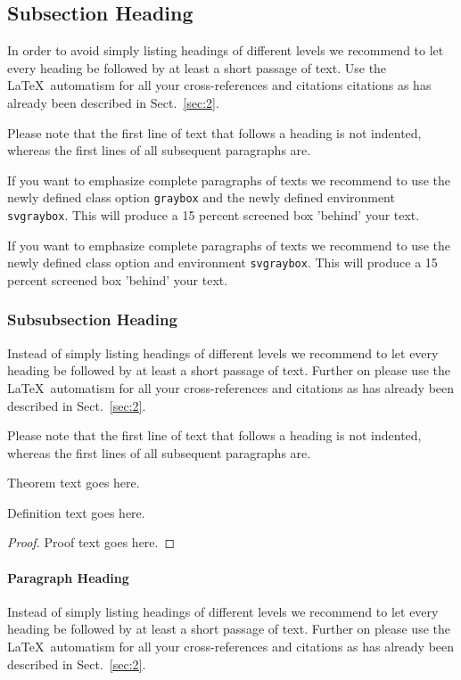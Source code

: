 \documentclass[graybox]{svmult}
\begin{document}
\subsection{Subsection Heading} %
In order to avoid simply listing headings of different levels we recommend to let every heading be followed by at least a short passage of text. Use the \LaTeX\ automatism for all your cross-references and citations citations as has already been described in Sect.~\ref{sec:2}.

Please note that the first line of text that follows a heading is not indented, whereas the first lines of all subsequent paragraphs are.

\begin{svgraybox}
If you want to emphasize complete paragraphs of texts we recommend to use the newly defined class option \verb|graybox| and the newly defined environment \verb|svgraybox|. This will produce a 15 percent screened box 'behind' your text.

If you want to emphasize complete paragraphs of texts we recommend to use the newly defined class option and environment \verb|svgraybox|. This will produce a 15 percent screened box 'behind' your text.
\end{svgraybox}


\subsubsection{Subsubsection Heading}
Instead of simply listing headings of different levels we recommend to let every heading be followed by at least a short passage of text.  Further on please use the \LaTeX\ automatism for all your cross-references and citations as has already been described in Sect.~\ref{sec:2}.

Please note that the first line of text that follows a heading is not indented, whereas the first lines of all subsequent paragraphs are.

\begin{theorem}
Theorem text goes here.
\end{theorem}
%
%
\begin{definition}
Definition text goes here.
\end{definition}

\begin{proof}
Proof text goes here.
\end{proof}

\paragraph{Paragraph Heading} %
Instead of simply listing headings of different levels we recommend to let every heading be followed by at least a short passage of text.  Further on please use the \LaTeX\ automatism for all your cross-references and citations as has already been described in Sect.~\ref{sec:2}.
\end{document}
